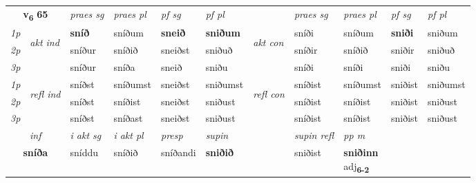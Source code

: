 \noindent
\begin{tabular}{lllllllllll} \toprule
\multicolumn{2}{c}{\textbf{v{\textsubscript{6}}} \Large{\textbf{65}}}  &  \textit{praes sg}  & \textit{praes pl}  &\textit{ pf sg} & \textit{pf pl} &  &  \textit{praes sg}  & \textit{praes pl}  & \textit{pf sg} & \textit{pf pl } \\*
	\cmidrule{3-6} \cmidrule{8-11}
 {\textit{1p}} & \multirow{3}{*}{\begin{turn}{90}\textit{akt ind}\end{turn}} & \textbf{sníð} & sníðum & \textbf{sneið} & \textbf{sniðum} & \multirow{3}{*}{\begin{turn}{90}\textit{akt con}\end{turn}} &sníði & sníðum & \textbf{sniði} & sniðum\\*
 {\textit{2p}} &  &  sníður  & sníðið & sneiðst & sniðuð & & sníðir & sníðið & sniðir & sniðuð \\*
{\textit{3p}} &  & sníður & sníða & sneið & sniðu & & sníði & sníði& sniði & sniðu \\*
\cmidrule{3-6} \cmidrule{8-11}
 {\textit{1p}} & \multirow{3}{*}{\begin{turn}{90}\textit{refl ind}\end{turn}}  & sníðst & sníðumst & sneiðst & sniðumst & \multirow{3}{*}{\begin{turn}{90}\textit{refl con}\end{turn}}  &sníðist & sníðumst & sniðist & sniðumst \\*
 {\textit{2p}} &  & sníðst & sníðist & sneiðst & sniðust & &sníðist & sníðist & sniðist & sniðust \\*
 {\textit{3p}}  & & sníðst & sníðast & sneiðst & sniðust & & sníðist & sníðist& sniðist & sniðust \\*
\cmidrule{3-6} \cmidrule{8-11}

   \multicolumn{2}{c}{\textit{inf}}  & \textit{i akt sg} & \textit{i akt pl}   & \textit{presp} & \textit{supin} && \textit{supin refl} & \textit{pp m} \\*
  \multicolumn{2}{c}{\textbf{sníða}} & sníddu  & sníðið   & sníðandi &  \textbf{sniðið} && sniðist & \specialcell{\textbf{sniðinn} \\ adj\textbf{\textsubscript{6-2}}} \\*
\end{tabular}

